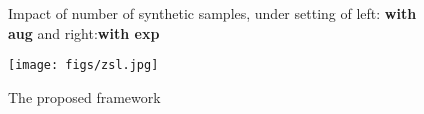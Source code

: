 \begin{figure}
        
        
    \caption{Impact of number of synthetic samples, under setting of left: \textbf{with aug} and right:\textbf{with exp}}
    \label{var_sample_augexp}
\end{figure}

\begin{figure}
    \centering
        \texttt{[image: figs/zsl.jpg]}
    \caption{The proposed framework}
    \label{whole_frame}
\end{figure}











